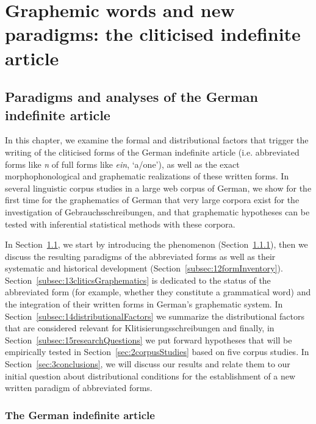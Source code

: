 \chapter{Graphemic words and new paradigms: the cliticised indefinite article}
\label{sec:graphemicwordsandnewparadigms}

\section{Paradigms and analyses of the German indefinite article}
\label{sec:1paradigmsAndAnalyses}

In this chapter, we examine the formal and distributional factors that trigger the writing of the cliticised forms of the German indefinite article (i.e. abbreviated forms like \textit{n} of full forms like \textit{ein}, `a/one'), as well as the exact morphophonological and graphematic realizations of these written forms.
In several linguistic corpus studies in a large web corpus of German, we show for the first time for the graphematics of German that very large corpora exist for the investigation of Gebrauchsschreibungen, and that graphematic hypotheses can be tested with inferential statistical methods with these corpora.

In Section~\ref{sec:1paradigmsAndAnalyses}, we start by introducing the phenomenon (Section~\ref{subsec:11GermIndefArticle}), then we discuss the resulting paradigms of the abbreviated forms as well as their systematic and historical development (Section~\ref{subsec:12formInventory}).
Section~\ref{subsec:13cliticsGraphematics} is dedicated to the status of the abbreviated form (for example, whether they constitute a grammatical word) and the integration of their written forms in German's graphematic system.
In Section~\ref{subsec:14distributionalFactors} we summarize the distributional factors that are considered relevant for Klitisierungsschreibungen and finally, in Section~\ref{subsec:15researchQuestions} we put forward hypotheses that will be empirically tested in Section~\ref{sec:2corpusStudies} based on five corpus studies.
In Section~\ref{sec:3conclusions}, we will discuss our results and relate them to our initial question about distributional conditions for the establishment of a new written paradigm of abbreviated forms.

\subsection{The German indefinite article}
\label{subsec:11GermIndefArticle}


